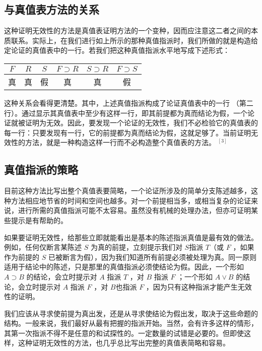 \subsection{与真值表方法的关系}

这种证明无效性的方法是真值表证明方法的一个变种，因而应注意这二者之间的本质联系。实际上，在我们进行如上所示的那种真值指派时，我们所做的就是构造给定论证的真值表中的一行。若我们把这种真值指派水平地写成下述形式：

\begin{center}
\begin{tabular}{|cccccc|}
\hline
$F$ & $R$ & $S$ & $F \supset R$ & $S \supset R$ & $F \supset S$ \\
\hline
真 & 真 & 假 & 真 & 真 & 假 \\
\hline
\end{tabular}
\end{center}

这种关系会看得更清楚。其中，上述真值指派构成了论证真值表中的一行 （第二行）。通过显示其真值表中至少有这样一行，即其前提都为真而结论为假，一个论证就被证明为无效。因此，要发现一个论证的无效性，我们不必检验它的真值表的每一行：只要发现有一行，它的前提都为真而结论为假，这就足够了。当前证明无效性的方法，就是一种构造这样一行而不必构造整个真值表的方法。 ${ }^{[3]}$

\subsection{真值指派的策略}

目前这种方法比写出整个真值表要简略，一个论证所涉及的简单分支陈述越多，这种方法相应地节省的时间和空间也越多。对一个前提相当多，或相当复杂的论证来说，进行所需的真值指派可能不太容易。虽然没有机械的处理办法，但亦可证明某些提示是有帮助的。

如果要证明无效性，给那些立即就能看出是基本的陈述指派真值是最有效的做法。例如，任何仅断言某陈述 $S$ 为真的前提，立刻提示我们对 $S$指派 $T$（或 $F$ ，如果作为前提的 $S$ 已被断言为假），因为我们知道所有前提必须被处理为真。同一原则适用于结论中的陈述，只是那里的真值指派必须使结论为假。因此，一个形如 $A \supset B$ 的结论，会立时提示对 $A$ 指派 $T$ ，对 $B$ 指派 $F$ ；一个形如 $A \vee B$ 的结论，会立时提示对 $A$ 指派 $F$ ，对 $B$也指派 $F$ ，因为只有这种指派才能产生无效性的证明。

我们应该从寻求使前提为真出发，还是从寻求使结论为假出发，取决于这些命题的结构。一般来说，我们最好从最有把握的指派开始。当然，会有许多这样的情形，其第一次指派不得不是任意的和试探性的。一定数量的试错是必要的。但即使这样，这种证明无效性的方法，也几乎总比写出完整的真值表简略和容易。 

